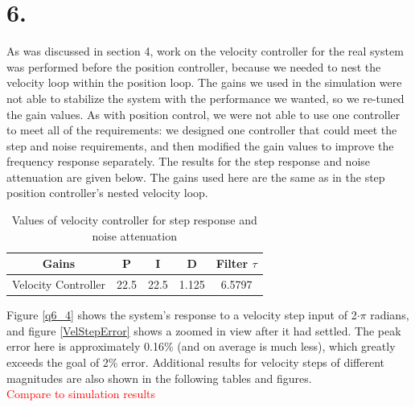 \documentclass{article}
\newcommand{\xxx}[1]{\textcolor{red}{#1}}
\theoremstyle{plain}
\theoremstyle{definition}
\theoremstyle{remark}
\begin{document}
\clearpage

\section*{6.}
As was discussed in section 4, work on the velocity controller for the real system was performed before the position controller, because we needed to nest the velocity loop within the position loop. The gains we used in the simulation were not able to stabilize the system with the performance we wanted, so we re-tuned the gain values. As with position control, we were not able to use one controller to meet all of the requirements: we designed one controller that could meet the step and noise requirements, and then modified the gain values to improve the frequency response separately. The results for the step response and noise attenuation are given below. The gains used here are the same as in the step position controller's nested velocity loop.\\

\begin{table}[htb]
\begin{center}
    \begin{tabular}{|c|c|c|c|c|}
        \hline
        Gains & P   & I & D     & Filter $\tau$   \\ \hline
        Velocity Controller       & 22.5   & 22.5    & 1.125    & 6.5797  \\ 
       \hline
    \end{tabular}
\end{center}
\caption{Values of velocity controller for step response and noise attenuation}
\label{velocityGains}
\end{table}

Figure \ref{q6_4} shows the system's response to a velocity step input of 2$\cdot\pi$ radians, and figure \ref{VelStepError} shows a zoomed in view after it had settled. The peak error here is approximately 0.16\% (and on average is much less), which greatly exceeds the goal of 2\% error. Additional results for velocity steps of different magnitudes are also shown in the following tables and figures.\\

\xxx{Compare to simulation results}
\end{document}
